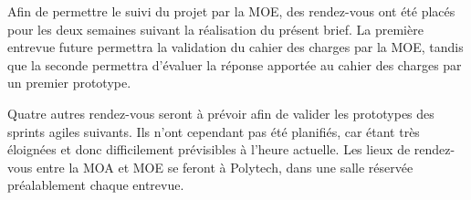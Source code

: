 \documentclass[12pt,titlepage]{report}
\begin{document}
\begin{justify}
 \tab 
\end{justify}\par

\begin{justify}
Afin de permettre le suivi du projet par la MOE, des rendez-vous ont été placés pour les deux semaines suivant la réalisation du présent brief. La première entrevue future permettra la validation du cahier des charges par la MOE, tandis que la seconde permettra d’évaluer la réponse apportée au cahier des charges par un premier prototype. 
\end{justify}\par

\begin{justify}
Quatre autres rendez-vous seront à prévoir afin de valider les prototypes des sprints agiles suivants. Ils n’ont cependant pas été planifiés, car étant très éloignées et donc difficilement prévisibles à l’heure actuelle. Les lieux de rendez-vous entre la MOA et MOE se feront à Polytech, dans une salle réservée préalablement chaque entrevue. \\

\end{justify}\par
\end{document}
